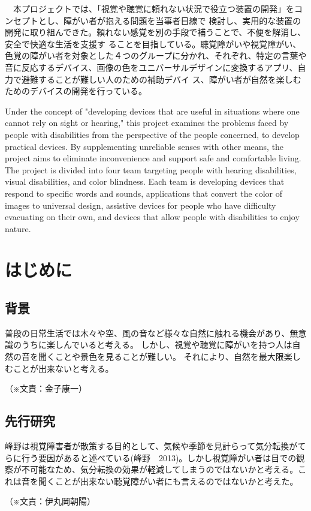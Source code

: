 \documentclass[11pt,a4paper]{report}
\newcommand{\Writer}[1]{
  \normalsize
  \begin{flushright}
    （※文責：#1）
  \end{flushright}
}
\begin{document}
{
    \centerline{
      \huge{}
    }
    \vspace{1cm}
    \noindent
    　本プロジェクトでは、「視覚や聴覚に頼れない状況で役立つ装置の開発」をコンセプトとし、障がい者が抱える問題を当事者目線で
検討し、実用的な装置の開発に取り組んできた。頼れない感覚を別の手段で補うことで、不便を解消し、安全で快適な生活を支援す
ることを目指している。聴覚障がいや視覚障がい、色覚の障がい者を対象とした４つのグループに分かれ、それぞれ、特定の言葉や
音に反応するデバイス、画像の色をユニバーサルデザインに変換するアプリ、自力で避難することが難しい人のための補助デバイ
ス、障がい者が自然を楽しむためのデバイスの開発を行っている。

}
\newpage
{
    \centerline{
      \textbf{\huge{}}
    }
    \vspace{1cm}
    \noindent
    \space Under the concept of "developing devices that are useful in situations where one cannot rely on sight or hearing," this project examines the
problems faced by people with disabilities from the perspective of the people concerned, to develop practical devices. By supplementing
unreliable senses with other means, the project aims to eliminate inconvenience and support safe and comfortable living. The project is
divided into four team targeting people with hearing disabilities, visual disabilities, and color blindness. Each team is developing devices that
respond to specific words and sounds, applications that convert the color of images to universal design, assistive devices for people who
have difficulty evacuating on their own, and devices that allow people with disabilities to enjoy nature.

}
\newpage

\tableofcontents
\newpage

\chapter{はじめに}
\section{背景}
\noindent\space
普段の日常生活では木々や空、風の音など様々な自然に触れる機会があり、無意識のうちに楽しんでいると考える。
しかし、視覚や聴覚に障がいを持つ人は自然の音を聞くことや景色を見ることが難しい。
それにより、自然を最大限楽しむことが出来ないと考える。
\Writer{金子康一}

\section{先行研究}
\noindent\space
峰野は視覚障害者が散策する目的として、気候や季節を見計らって気分転換がてらに行う要因があると述べている(峰野　2013)。しかし視覚障がい者は目での観察が不可能なため、気分転換の効果が軽減してしまうのではないかと考える。これは音を聞くことが出来ない聴覚障がい者にも言えるのではないかと考えた。
\Writer{伊丸岡朝陽}
\end{document}
